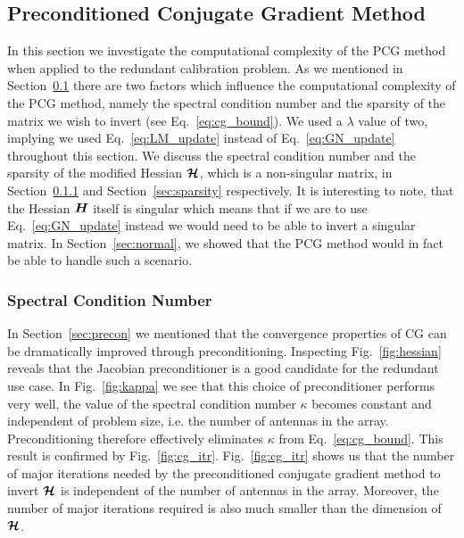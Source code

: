 \documentclass[useAMS,usenatbib]{mn2e}
\newcommand{\bH}{\bmath{H}}
\newcommand{\bmH}{\bmath{\mathcal{H}}}
\begin{document}
\subsection{Preconditioned Conjugate Gradient Method}
\label{sec:pcg}
In this section we investigate the computational complexity of the PCG method when applied to the redundant calibration problem. 
As we mentioned in Section~\ref{sec:pcg} there are two factors which influence the computational complexity of the PCG method, namely the spectral condition number and the sparsity of the matrix we wish to invert (see Eq.~\eqref{eq:cg_bound}). 
We used a $\lambda$ value of two, implying we used Eq.~\eqref{eq:LM_update} instead of Eq.~\eqref{eq:GN_update} throughout this section.
We discuss the spectral condition number and the sparsity of the modified Hessian $\bmH$, which is a non-singular matrix, in Section~\ref{sec:scn} and Section~\ref{sec:sparsity} respectively.
It is interesting to note, that the Hessian $\bH$ itself is singular which means that if we are to use Eq.~\eqref{eq:GN_update} instead we would need to be able to invert a singular matrix. In Section~\ref{sec:normal},
we showed that the PCG method would in fact be able to handle such a scenario.

\subsubsection{Spectral Condition Number}
\label{sec:scn}
In Section~\ref{sec:precon} we mentioned that the convergence properties of CG can be dramatically improved through preconditioning. Inspecting Fig.~\ref{fig:hessian} reveals that the Jacobian preconditioner
is a good candidate for the redundant use case. In Fig.~\ref{fig:kappa} we see that this choice of preconditioner performs very well, the value of the spectral condition number $\kappa$
becomes constant and independent of problem size, i.e. the number of antennas in the array. Preconditioning therefore effectively eliminates $\kappa$ from Eq.~\eqref{eq:cg_bound}. This result
is confirmed by Fig.~\ref{fig:cg_itr}. Fig.~\ref{fig:cg_itr} shows us that the number of major iterations needed by the preconditioned conjugate gradient method to invert $\bmH$ is independent of the number of antennas in the array.
Moreover, the number of major iterations required is also much smaller than the dimension of $\bmH$. 
\end{document}
